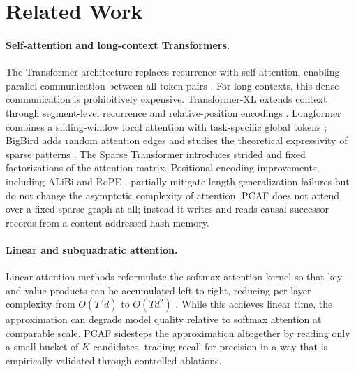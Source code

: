\documentclass[11pt]{article}
\begin{document}
\section{Related Work}

\paragraph{Self-attention and long-context Transformers.}
The Transformer architecture replaces recurrence with self-attention, enabling
parallel communication between all token pairs
\citep{vaswani2017attention}. For long contexts, this dense communication is
prohibitively expensive. Transformer-XL extends context through segment-level
recurrence and relative-position encodings \citep{dai2019transformerxl}.
Longformer combines a sliding-window local attention with task-specific global
tokens \citep{beltagy2020longformer}; BigBird adds random attention edges and
studies the theoretical expressivity of sparse patterns
\citep{zaheer2020bigbird}. The Sparse Transformer \citep{child2019sparsetransformer}
introduces strided and fixed factorizations of the attention matrix. Positional
encoding improvements, including ALiBi \citep{press2021alibi} and RoPE
\citep{su2021roformer}, partially mitigate length-generalization failures but do
not change the asymptotic complexity of attention. PCAF does not attend over a
fixed sparse graph at all; instead it writes and reads causal successor records
from a content-addressed hash memory.

\paragraph{Linear and subquadratic attention.}
Linear attention methods reformulate the softmax attention kernel so that key
and value products can be accumulated left-to-right, reducing per-layer
complexity from $O(T^2 d)$ to $O(T d^2)$
\citep{katharopoulos2020linearattn}. While this achieves linear time, the
approximation can degrade model quality relative to softmax attention at
comparable scale. PCAF sidesteps the approximation altogether by reading only a
small bucket of $K$ candidates, trading recall for precision in a way that is
empirically validated through controlled ablations.
\end{document}
